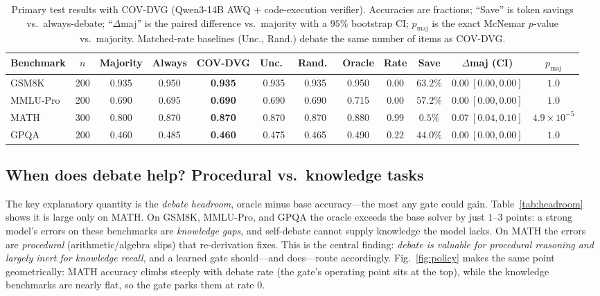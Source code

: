 \documentclass[conference]{IEEEtran}
\begin{document}
\begin{table}[!t]
\caption{Primary test results with COV-DVG (Qwen3-14B AWQ $+$ code-execution verifier).
Accuracies are fractions; ``Save'' is token savings vs.\ always-debate; ``$\Delta$maj''
is the paired difference vs.\ majority with a $95\%$ bootstrap CI; $p_\text{maj}$ is the
exact McNemar $p$-value vs.\ majority. Matched-rate baselines (Unc., Rand.) debate the
same number of items as COV-DVG.}
\label{tab:main}
\centering
\begin{tabular}{lccccccccccc}
\toprule
Benchmark & $n$ & Majority & Always & \textbf{COV-DVG} & Unc.\ & Rand.\ & Oracle & Rate & Save & $\Delta$maj (CI) & $p_\text{maj}$ \\
\midrule
GSM8K    & 200 & 0.935 & 0.950 & \textbf{0.935} & 0.935 & 0.935 & 0.950 & 0.00 & $63.2\%$ & $0.00\ [0.00,0.00]$ & $1.0$ \\
MMLU-Pro & 200 & 0.690 & 0.695 & \textbf{0.690} & 0.690 & 0.690 & 0.715 & 0.00 & $57.2\%$ & $0.00\ [0.00,0.00]$ & $1.0$ \\
MATH     & 300 & 0.800 & 0.870 & \textbf{0.870} & 0.870 & 0.870 & 0.880 & 0.99 & $0.5\%$  & $0.07\ [0.04,0.10]$ & $4.9\!\times\!10^{-5}$ \\
GPQA     & 200 & 0.460 & 0.485 & \textbf{0.460} & 0.475 & 0.465 & 0.490 & 0.22 & $44.0\%$ & $0.00\ [0.00,0.00]$ & $1.0$ \\
\bottomrule
\end{tabular}
\end{table}

\subsection{When does debate help? Procedural vs.\ knowledge tasks}
The key explanatory quantity is the \emph{debate headroom}, oracle minus base
accuracy---the most any gate could gain. Table~\ref{tab:headroom} shows it is large
only on MATH. On GSM8K, MMLU-Pro, and GPQA the oracle exceeds the base solver by just
$1$--$3$ points: a strong model's errors on these benchmarks are \emph{knowledge
gaps}, and self-debate cannot supply knowledge the model lacks. On MATH the errors are
\emph{procedural} (arithmetic/algebra slips) that re-derivation fixes. This is the
central finding: \emph{debate is valuable for procedural reasoning and largely inert
for knowledge recall}, and a learned gate should---and does---route accordingly.
Fig.~\ref{fig:policy} makes the same point geometrically: MATH accuracy climbs steeply
with debate rate (the gate's operating point sits at the top), while the knowledge
benchmarks are nearly flat, so the gate parks them at rate $0$.
\end{document}
